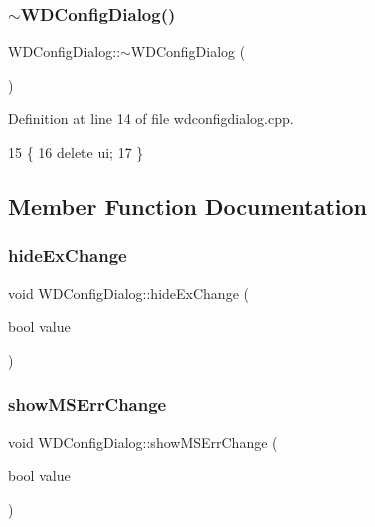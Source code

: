 \subsubsection{\texorpdfstring{$\sim$\+W\+D\+Config\+Dialog()}{~WDConfigDialog()}}
{\footnotesize\ttfamily W\+D\+Config\+Dialog\+::$\sim$\+W\+D\+Config\+Dialog (\begin{DoxyParamCaption}{ }\end{DoxyParamCaption})}



Definition at line 14 of file wdconfigdialog.\+cpp.


\begin{DoxyCode}
15 \{
16     \textcolor{keyword}{delete} ui;
17 \}
\end{DoxyCode}


\subsection{Member Function Documentation}
\mbox{\label{class_w_d_config_dialog_aa808e6dfb8b3489d9252f193f39ed22a}} 
\subsubsection{\texorpdfstring{hide\+Ex\+Change}{hideExChange}}
{\footnotesize\ttfamily void W\+D\+Config\+Dialog\+::hide\+Ex\+Change (\begin{DoxyParamCaption}\item[{bool}]{value }\end{DoxyParamCaption})\hspace{0.3cm}{\ttfamily [signal]}}

\mbox{\label{class_w_d_config_dialog_a016142c07d15c313cbe71098e3c5b4df}} 
\subsubsection{\texorpdfstring{show\+M\+S\+Err\+Change}{showMSErrChange}}
{\footnotesize\ttfamily void W\+D\+Config\+Dialog\+::show\+M\+S\+Err\+Change (\begin{DoxyParamCaption}\item[{bool}]{value }\end{DoxyParamCaption})\hspace{0.3cm}{\ttfamily [signal]}}

